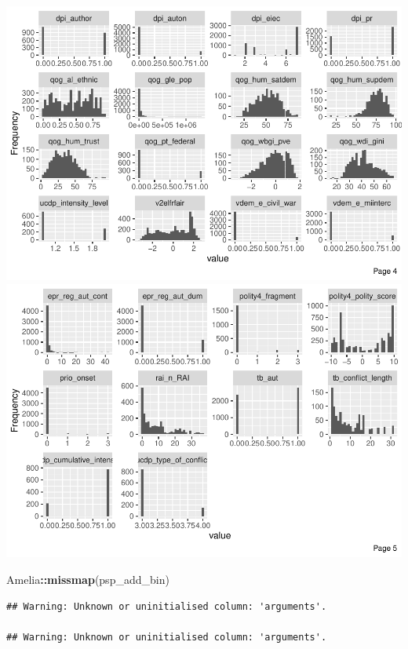 \documentclass[
]{article}
\newenvironment{Shaded}{\begin{snugshade}}{\end{snugshade}}
\newcommand{\KeywordTok}[1]{\textcolor[rgb]{0.13,0.29,0.53}{\textbf{#1}}}
\newcommand{\NormalTok}[1]{#1}
\newcommand{\OperatorTok}[1]{\textcolor[rgb]{0.81,0.36,0.00}{\textbf{#1}}}
\begin{document}
\includegraphics{01_tjbrailey_wrangle_data_files/figure-latex/unnamed-chunk-19-4.pdf}
\includegraphics{01_tjbrailey_wrangle_data_files/figure-latex/unnamed-chunk-19-5.pdf}

\begin{Shaded}
\begin{Highlighting}[]
\NormalTok{Amelia}\OperatorTok{::}\KeywordTok{missmap}\NormalTok{(psp_add_bin)}
\end{Highlighting}
\end{Shaded}

\begin{verbatim}
## Warning: Unknown or uninitialised column: 'arguments'.

## Warning: Unknown or uninitialised column: 'arguments'.
\end{verbatim}
\end{document}
